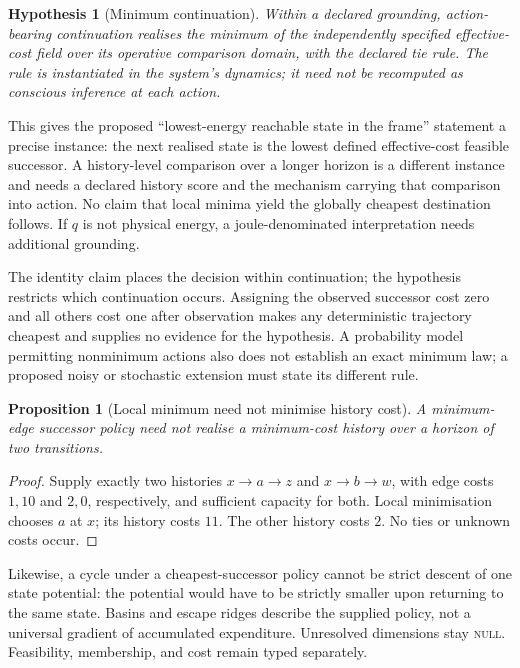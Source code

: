 \documentclass[11pt,a4paper]{article}
\newtheorem{proposition}[definition]{Proposition}
\newtheorem{hypothesis}[definition]{Hypothesis}
\theoremstyle{remark}
\begin{document}
\begin{hypothesis}[Minimum continuation]\label{hyp:minimum}
Within a declared grounding, action-bearing continuation realises the minimum
of the independently specified effective-cost field over its operative
comparison domain, with the declared tie rule. The rule is instantiated in
the system's dynamics; it need not be recomputed as conscious inference at
each action.
\end{hypothesis}

This gives the proposed ``lowest-energy reachable state in the frame''
statement a precise instance: the next realised state is the lowest defined
effective-cost feasible successor. A history-level comparison over a longer
horizon is a different instance and needs a declared history score and the
mechanism carrying that comparison into action. No claim that local minima
yield the globally cheapest destination follows. If \(q\) is not physical
energy, a joule-denominated interpretation needs additional grounding.

The identity claim places the decision within continuation; the hypothesis
restricts which continuation occurs. Assigning the observed successor cost
zero and all others cost one after observation makes any deterministic
trajectory cheapest and supplies no evidence for the hypothesis. A probability
model permitting nonminimum actions also does not establish an exact minimum
law; a proposed noisy or stochastic extension must state its different rule.

\begin{proposition}[Local minimum need not minimise history cost]\label{prop:local-global}
A minimum-edge successor policy need not realise a minimum-cost history over
a horizon of two transitions.
\end{proposition}
\begin{proof}
Supply exactly two histories \(x\to a\to z\) and \(x\to b\to w\), with
edge costs \(1,10\) and \(2,0\), respectively, and sufficient capacity for
both. Local minimisation chooses \(a\) at \(x\); its history costs \(11\).
The other history costs \(2\). No ties or unknown costs occur.
\end{proof}

Likewise, a cycle under a cheapest-successor policy cannot be strict descent
of one state potential: the potential would have to be strictly smaller upon
returning to the same state. Basins and escape ridges describe the supplied
policy, not a universal gradient of accumulated expenditure. Unresolved
dimensions stay \textsc{null}. Feasibility, membership, and cost remain typed
separately.
\end{document}
